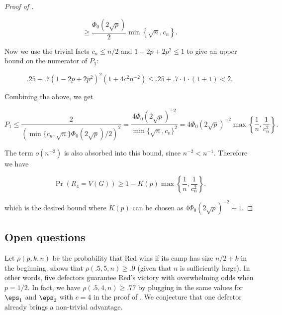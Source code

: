 \documentclass{toc}
\begin{document}
\begin{proof}[Proof of ]
\begin{linenomath}
\begin{equation*}
						\ge \frac{\Phi_0\left(2\sqrt{p}\right)}{2}\min\left\{\sqrt{n}, c_n \right\}.
				\end{equation*}\end{linenomath}
				Now we use the trivial facts $c_n \le n/2$ and $1 - 2p + 2p^2 \le 1$ 
				to give an upper bound on %
				the numerator of $P_1$:
				\begin{linenomath}\begin{equation*}
						.25 + .7(1 - 2p + 2p^2)^2 \left(1 + 4c^2n^{-2}\right) \le .25 + .7 \cdot 1 \cdot (1 + 1) < 2.
				\end{equation*}\end{linenomath}
				Combining the above, we get
				\begin{linenomath}\begin{equation*}
						P_1 \le \frac{2}{\left(\min\{c_n, \sqrt{n}\}\Phi_0(2\sqrt{p})/2 \right)^2}
						= \frac{4\Phi_0(2\sqrt{p})^{-2}}{\min\{\sqrt{n}, c_n\}^2}
						= 4\Phi_0(2\sqrt{p})^{-2} \max\left\{\frac{1}{n}, \frac{1}{c_n^2}\right\}.
				\end{equation*}\end{linenomath}
				The term $o(n^{-2})$ is also absorbed into this bound, since $n^{-2} < n^{-1}$.
				Therefore we have
				\begin{linenomath}\begin{equation*}
						\Pr(R_4 = V(G)) \ge 1 - K(p)\max\left\{\frac{1}{n}, \frac{1}{c_n^2}\right\}.
				\end{equation*}\end{linenomath}
				which is the desired bound where $K(p)$ can be chosen as $4\Phi_0(2\sqrt{p})^{-2} + 1$.
			\end{proof}
			
			
			
			
			
			\subsection {Open questions}
			
			
			Let $\rho(p, k, n)$ be the probability that Red %
			wins  %
			if its camp has size $n/2 + k$ in the beginning.
			 shows that $\rho (.5, 5, n) \ge .9$ (given that $n$ is sufficiently large).
			In other words, five defectors guarantee Red's victory with overwhelming odds when $p = 1/2$.
			In fact, we have $\rho(.5, 4, n) \ge .77$ by plugging in the same values for $\eps_1$ and $\eps_2$ with $c = 4$ in 
			the proof of .  %
			We conjecture that one defector already brings a non-trivial advantage.
			
\end{document}
